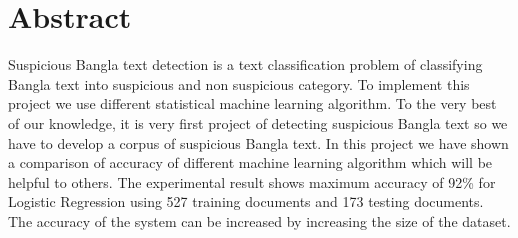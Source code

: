 \section{\hfil Abstract \hfil}
\vspace{1cm}
\onehalfspacing
Suspicious Bangla text detection is a text classification problem of classifying Bangla text into suspicious and non suspicious category. To implement this project we use different statistical machine learning algorithm. To the very best of our knowledge, it is very first project of detecting suspicious Bangla text so we have to develop a corpus of suspicious Bangla text. In this project we have shown a comparison of accuracy of different machine learning algorithm which will be helpful to others. The experimental result shows maximum accuracy of 92\% for Logistic Regression using 527 training documents and 173 testing documents. The accuracy of the system can be increased by increasing the size of the dataset.     

\setcounter{secnumdepth}{3} %
\clearpage %